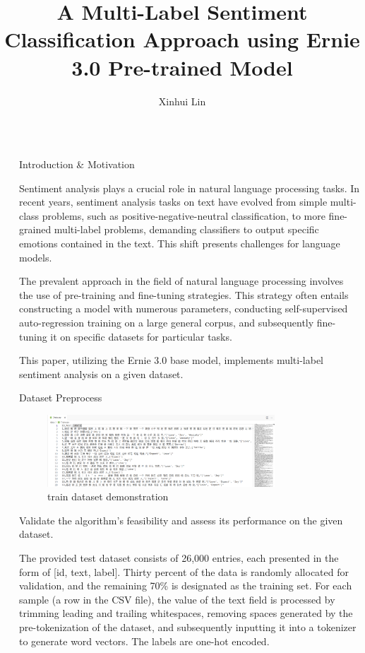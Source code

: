\documentclass[final]{beamer}
\title{A Multi-Label Sentiment Classification Approach using Ernie 3.0 Pre-trained Model}
\author{Xinhui Lin}
\institute[shortinst]{School of Computer Science and Engineering, Northeastern University}
\newlength{\sepwidth}
\newlength{\colwidth}
\newcommand{\separatorcolumn}{\begin{column}{\sepwidth}\end{column}}
\begin{document}
\begin{frame}[t]
\begin{columns}[t]
\separatorcolumn

\begin{column}{\colwidth}

\begin{block}{Introduction \& Motivation}

    Sentiment analysis plays a crucial role in natural language processing tasks. In recent years, sentiment analysis tasks on text have evolved from simple multi-class problems, such as positive-negative-neutral classification, to more fine-grained multi-label problems, demanding classifiers to output specific emotions contained in the text. This shift presents challenges for language models. 
    
    The prevalent approach in the field of natural language processing involves the use of pre-training and fine-tuning strategies. This strategy often entails constructing a model with numerous parameters, conducting self-supervised auto-regression training on a large general corpus, and subsequently fine-tuning it on specific datasets for particular tasks.
    
    This paper, utilizing the Ernie 3.0 base model, implements multi-label sentiment analysis on a given dataset.

  \end{block}
  
  \begin{block}{Dataset Preprocess}

      \begin{figure}
        \centering
        \includegraphics[width=0.8\textwidth]{logos/2024-01-01_21-35.png}
        \caption{train dataset demonstration}
        \label{fig: ERNIE 3.0 framework}
    \end{figure}

  Validate the algorithm's feasibility and assess its performance on the given dataset. 
  
  The provided test dataset consists of 26,000 entries, each presented in the form of [id, text, label]. Thirty percent of the data is randomly allocated for validation, and the remaining 70\% is designated as the training set. For each sample (a row in the CSV file), the value of the text field is processed by trimming leading and trailing whitespaces, removing spaces generated by the pre-tokenization of the dataset, and subsequently inputting it into a tokenizer to generate word vectors. The labels are one-hot encoded.
  

\end{block}
\end{column}
\end{columns}
\end{frame}
\end{document}
